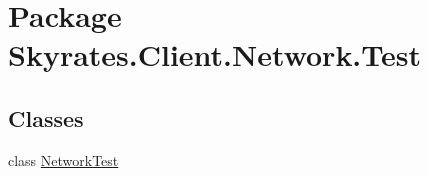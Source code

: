 \hypertarget{namespace_skyrates_1_1_client_1_1_network_1_1_test}{\section{Package Skyrates.\-Client.\-Network.\-Test}
\label{namespace_skyrates_1_1_client_1_1_network_1_1_test}
}
\subsection*{Classes}
\begin{DoxyCompactItemize}
\item 
class \hyperlink{class_skyrates_1_1_client_1_1_network_1_1_test_1_1_network_test}{Network\-Test}
\end{DoxyCompactItemize}
